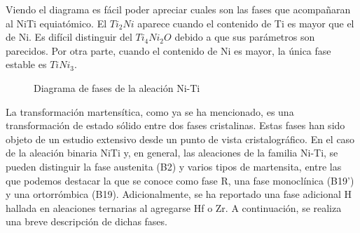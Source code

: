 \documentclass{article}
\theoremstyle{definition}
\theoremstyle{remark}
\begin{document}
Viendo el diagrama es fácil poder apreciar cuales son las fases que acompañaran al NiTi equiatómico. El $Ti_2Ni$ aparece cuando el contenido de Ti es mayor que el de Ni. Es difícil distinguir del $Ti_4Ni_2O$ debido a que sus parámetros son parecidos. Por otra parte, cuando el contenido de Ni es mayor, la única fase estable es $TiNi_3$.

\begin{figure}[H]
	\centering
	\caption{Diagrama de fases de la aleación Ni-Ti}
	\label{PhaseDiagram}
\end{figure}

La transformación martensítica, como ya se ha mencionado, es una transformación de estado sólido entre dos fases cristalinas. Estas fases han sido objeto de un estudio extensivo desde un punto de vista cristalográfico. En el caso de la aleación binaria NiTi y, en general, las aleaciones de la familia Ni-Ti, se pueden distinguir la fase austenita (B2) y varios tipos de martensita, entre las que podemos destacar la que se conoce como fase R, una fase monoclínica (B19’) y una ortorrómbica (B19). Adicionalmente, se ha reportado una fase adicional H hallada en aleaciones ternarias al agregarse Hf o Zr. A continuación, se realiza una breve descripción de dichas fases.
\end{document}
